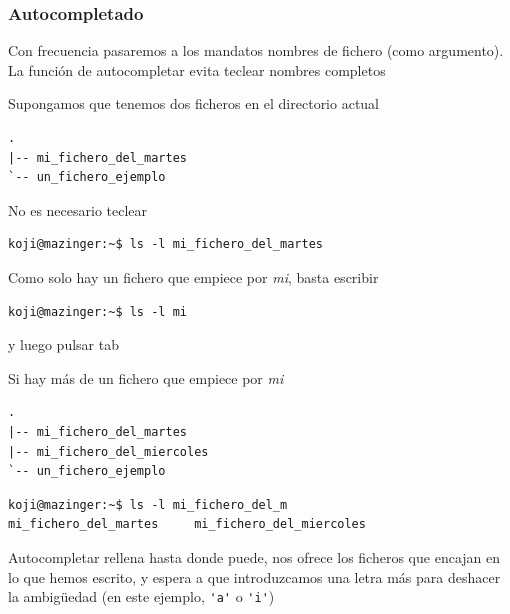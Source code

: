 \documentclass[ucs]{beamer}
\begin{document}
\begin{frame}[fragile]
\frametitle{Autocompletado}
Con frecuencia pasaremos a los mandatos nombres de fichero (como argumento).
La función de autocompletar evita teclear nombres completos

Supongamos que tenemos dos ficheros en el directorio actual


  \begin{footnotesize}
  \begin{verbatim}
.
|-- mi_fichero_del_martes
`-- un_fichero_ejemplo
  \end{verbatim}
  \end{footnotesize}

No es necesario teclear

  \begin{footnotesize}
  \begin{verbatim}
koji@mazinger:~$ ls -l mi_fichero_del_martes
  \end{verbatim}
  \end{footnotesize}

Como solo hay un fichero que empiece por \emph{mi}, basta escribir
  \begin{footnotesize}
  \begin{verbatim}
koji@mazinger:~$ ls -l mi
  \end{verbatim}
  \end{footnotesize}
y luego pulsar tab


\end{frame}

\begin{frame}[fragile]
Si hay más de un fichero que empiece por \emph{mi}

  \begin{footnotesize}
  \begin{verbatim}
.
|-- mi_fichero_del_martes
|-- mi_fichero_del_miercoles
`-- un_fichero_ejemplo
  \end{verbatim}
  \end{footnotesize}


  \begin{footnotesize}
  \begin{verbatim}
koji@mazinger:~$ ls -l mi_fichero_del_m
mi_fichero_del_martes     mi_fichero_del_miercoles 
  \end{verbatim}
  \end{footnotesize}

Autocompletar rellena hasta donde puede, nos ofrece los ficheros que encajan
en lo que hemos escrito, y espera a que introduzcamos una letra más para
deshacer la ambigüedad (en este ejemplo, \verb|'a'| o \verb|'i'|)

\end{frame}
\end{document}
